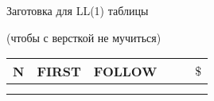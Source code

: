 \documentclass[12pt]{article}
\begin{document}
    \bigskip

    \begin{center} Заготовка для LL(1) таблицы

    (чтобы с версткой не мучиться)
    \end{center}
    \begin{center}
    \begin{tabular}{ l || c | c || c | c | c }
      N & FIRST & FOLLOW &  &  & $ \$ $ \\ \hline
        &       &        &  &  & \\
        &       &        &  &  &

    \end{tabular}
    \end{center}
\end{document}
